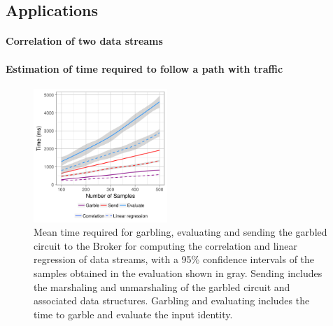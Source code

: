 \subsection{Applications}

\paragraph{Correlation of two data streams}




\paragraph{Estimation of time required to follow a path with traffic}


\begin{figure}
  \includegraphics[width=0.45\textwidth]{plots/stream.png}
  \caption{Mean time required for garbling, evaluating and sending the garbled
  circuit to the Broker for computing the correlation and linear regression of
  data streams, with a 95\% confidence intervals of the samples obtained in the
  evaluation shown in gray.  Sending includes the marshaling and unmarshaling
  of the garbled circuit and associated data structures.  Garbling and
  evaluating includes the time to garble and evaluate the input identity.}
  \label{stream-times}
\end{figure}

